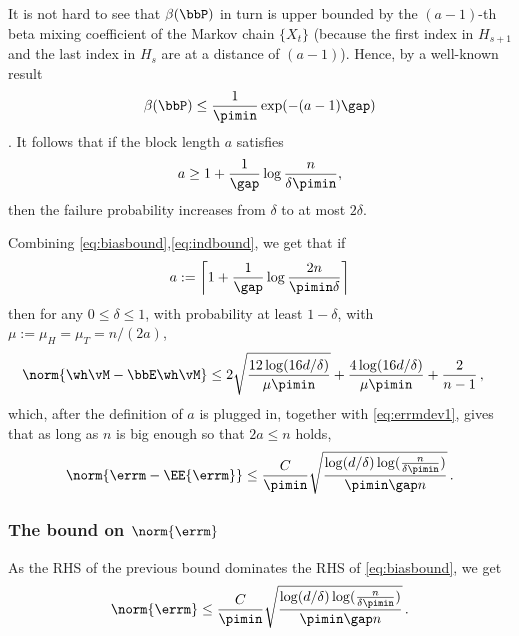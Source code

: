 It is not hard to see that $\beta(\bbP)$ in turn is upper bounded by 
the $(a-1)$-th beta mixing coefficient of the Markov chain $\{X_t\}$ (because the first
index in $H_{s+1}$ and the last index in $H_s$ are at a distance of $(a-1)$).
Hence, 
by a well-known result 
\[
  \beta(\bbP)
  \leq
  \frac{1}{\pimin} \exp(-(a-1)\gap)
\]
\citep[see, for instance,][]{bradley05}. 
It follows that if the block length $a$ satisfies
\begin{equation}
  \label{eq:block-length2}
  a \geq 1 + \frac{1}{\gap}\log\frac{n}{\delta\pimin}
  ,
\end{equation}
then the failure probability increases from $\delta$ to at most
$2\delta$.

Combining \eqref{eq:biasbound},\eqref{eq:indbound}, we get that if
\[
  a := \left\lceil 1 + \frac{1}{\gap}\log\frac{2n}{\pimin\delta} \right\rceil
\]
then for any $0\le \delta \le 1$, with probability at least $1-\delta$, with $\mu := \mu_H = \mu_T=n/(2a)$,
\begin{align*}
\norm{\wh\vM - \bbE \wh\vM }
& \le 
  2\sqrt{
    \frac{12\log(16d/\delta)}{\mu\pimin}
  }
  +
  \frac{4\log(16d/\delta)}{\mu\pimin}
  + 
  \frac{2}{n-1}\,,
\end{align*}
which, after the definition of $a$ is plugged in,
together with \eqref{eq:errmdev1},
 gives that as long as $n$ is big enough so that $2a\le n$ holds, 
\begin{align*}
\norm{\errm-\EE{\errm}}
\le \frac{C}{\pimin}
\sqrt{
    \frac{\log(d/\delta)\log(\frac{n}{\delta\pimin})}{\pimin\gap n}
  }
  \,.
\end{align*}
\subsubsection{The bound on $\norm{\errm}$}
As the RHS of the previous bound dominates the RHS of \eqref{eq:biasbound},
we get 
\begin{align}
\label{eq:doubletbound}
\norm{\errm}
\le \frac{C}{\pimin}
\sqrt{
    \frac{\log(d/\delta)\log(\frac{n}{\delta\pimin})}{\pimin\gap n}
  }\,.
\end{align}

